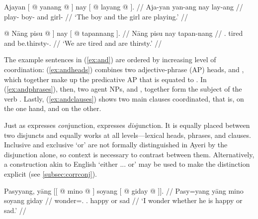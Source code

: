 \a\label{ex:andphrases}\begingl
	\gla Ajayan {\normalfont [} @ yanang @ {\normalfont ]} nay 
{\normalfont [} @ layang @ {\normalfont ].} //
	\glb Aja-yan {} yan-ang {} nay {} lay-ang {} //
	\glc play-\TplM{} {} boy-\Aarg{} {} and {} girl-\Aarg{} {} //
	\glft `The boy and the girl are playing.' //
\endgl

\a\label{ex:andclauses}\begingl
	\gla {\normalfont [\tsup{S}} @ Nāng pisu @ {\normalfont ]} nay 
{\normalfont [} @ tapannang {\normalfont ].} //
	\glb {} Nāng pisu {} nay {} tapan-nang {} //
	\glc {} \Fpl{}.\Aarg{} tired {} and {} be.thirsty-\Fpl{}.\Aarg{} {} //
	\glft `We are tired and are thirsty.' //
\endgl

\xe

The example sentences in (\ref{ex:and}) are ordered by increasing level of
coordination: (\ref{ex:andheads}) combines two adjective-phrase (AP) heads,
 and , which together make up
the predicative AP that is equated to . In
(\ref{ex:andphrases}), then, two agent NPs,  and
, together form the subject of the verb
. Lastly, (\ref{ex:andclauses}) shows two main
clauses coordinated, that is,  on the
one hand, and  on the other.



Just as  expresses \emph{con}junction,  
expresses \emph{dis}junction. It is equally placed between two disjuncts and 
equally works at all levels---lexical heads, phrases, and clauses. Inclusive 
and exclusive `or' are not formally distinguished in Ayeri by the disjunction 
 alone, so context is necessary to contrast between them. 
Alternatively, a construction akin to English `either ... or' may be used to 
make the distinction explicit (see \autoref{subsec:corrconj}).

\pex\label{ex:or}
\a\label{ex:orheads}\begingl
	\gla Pasyyang, yāng {\normalfont [[} @ mino @ 
		{\normalfont ]} soyang {\normalfont [} @ giday @ 
		{\normalfont ]].} //
	\glb Pasy=yang yāng {} mino {} soyang {} giday {} //
	\glc wonder=\Fsg{}.\Aarg{} \TsgM{}.\Aarg{} {} happy {} or {} sad {} //
	\glft `I wonder whether he is happy or sad.' //
\endgl

